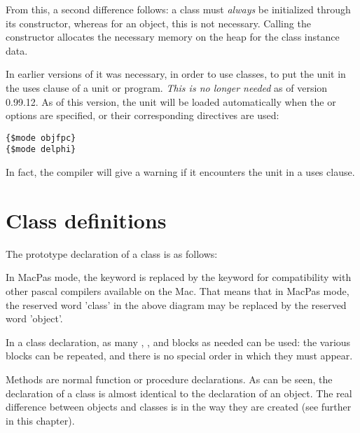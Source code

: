 From this, a second difference follows: a class must {\em always} be initialized
through its constructor, whereas for an object, this is not necessary.
Calling the constructor allocates the necessary memory on the heap for the
class instance data. 

\begin{remark}
In earlier versions of \fpc it was necessary, in order to use classes,
to put the  unit in the uses clause of a unit or program.
{\em This is no longer needed} as of version 0.99.12. As of this version,
the unit will be loaded automatically when the  or
  options are specified, or their corresponding directives are
used:
\begin{verbatim}
{$mode objfpc}
{$mode delphi}
\end{verbatim}
In fact, the compiler will give a warning if it encounters the
 unit in a uses clause.
\end{remark}

\section{Class definitions}
The prototype declaration of a class is as follows:


\begin{remark}
In MacPas mode, the  keyword is replaced by the 
keyword for compatibility with other pascal compilers available on the Mac. 
That means that in MacPas mode, the reserved word 'class' in the above
diagram may be replaced by the reserved word 'object'.
\end{remark}

In a class declaration, as many , , 
and  blocks as needed can be used: the various blocks can be
repeated, and there is no special order in which they must appear.

Methods are normal function or procedure declarations.
As can be seen, the declaration of a class is almost identical to the
declaration of an object. The real difference between objects and classes
is in the way they are created (see further in this chapter).

